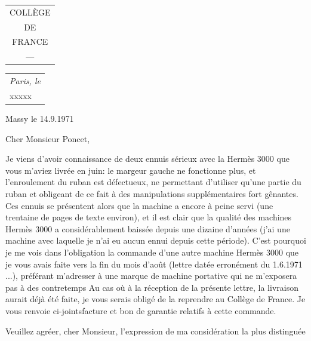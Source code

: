 \begin{tabular}{c}
COLLÈGE\\DE\\FRANCE\\---
\end{tabular}
\hfill\begin{tabular}{l}\textit{Paris, le}\\xxxxx\end{tabular}\quad Massy le 14.9.1971

Cher Monsieur Poncet,

Je viens d'avoir connaissance de deux ennuis sérieux avec la  Hermès 3000 que vous m'aviez livrée en juin: le margeur gauche ne fonctionne plus, et l'enroulement du ruban est défectueux, ne permettant d'utiliser qu'une partie du ruban et obligeant de ce fait à des manipulations supplémentaires fort gênantes. Ces ennuis se présentent alors que la machine a encore à peine servi (une trentaine de pages de texte environ), et il est clair que la qualité des machines Hermès 3000 a considérablement baissée depuis une dizaine d'années (j'ai une machine avec laquelle je n'ai eu aucun ennui depuis cette période). C'est pourquoi je me vois dans l'obligation  la commande d'une autre machine Hermès 3000 que je vous avais faite vers la fin du mois d'août (lettre datée erronément du 1.6.1971 ...), préférant m'adresser à une marque de machine portative qui ne m'exposera pas à des contretemps 
Au cas où à la réception de la présente lettre, la livraison aurait déjà été faite, je vous serais obligé de la reprendre au Collège de France. Je vous renvoie ci-jointsfacture et bon de garantie relatifs à cette commande.

Veuillez agréer, cher Monsieur, l'expression de ma considération la plus distinguée
